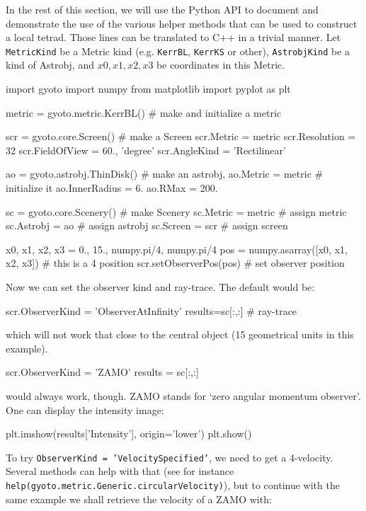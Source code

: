 \documentclass[a4paper,12pt]{article}
\begin{document}
In the rest of this section, we will use the Python API to document
and demonstrate the use of the various helper methods that can be used
to construct a local tetrad. Those lines can be translated to C++ in a
trivial manner. Let \texttt{MetricKind} be a Metric kind
(e.g. \texttt{KerrBL}, \texttt{KerrKS} or other), \texttt{AstrobjKind}
be a kind of Astrobj, and $x0, x1, x2, x3$ be coordinates in this
Metric.
\begin{code}
  import gyoto
  import numpy
  from matplotlib import pyplot as plt

  metric = gyoto.metric.KerrBL()        # make and initialize a metric

  scr = gyoto.core.Screen()             # make a Screen
  scr.Metric       = metric
  scr.Resolution   = 32
  scr.FieldOfView  = 60., 'degree'
  scr.AngleKind    = 'Rectilinear'

  ao = gyoto.astrobj.ThinDisk()         # make an astrobj,
  ao.Metric        = metric             # initialize it
  ao.InnerRadius   = 6.
  ao.RMax          = 200.

  sc = gyoto.core.Scenery()             # make Scenery
  sc.Metric        = metric             # assign metric
  sc.Astrobj       = ao                 # assign astrobj
  sc.Screen        = scr                # assign screen
  
  x0, x1, x2, x3 = 0., 15., numpy.pi/4, numpy.pi/4
  pos = numpy.asarray([x0, x1, x2, x3]) # this is a 4 position
  scr.setObserverPos(pos)               # set observer position
\end{code}

Now we can set the observer kind and ray-trace. The default would be:
\begin{code}
  scr.ObserverKind = 'ObserverAtInfinity'
  results=sc[:,:]                       # ray-trace
\end{code}
which will not work that close to the central object (15 geometrical
units in this example).

\begin{code}
  scr.ObserverKind = 'ZAMO'
  results = sc[:,:]
\end{code}
would always work, though. ZAMO stands for `zero angular momentum
observer'. One can display the intensity image:

\begin{code}
  plt.imshow(results['Intensity'], origin='lower')
  plt.show()
\end{code}

To try \texttt{ObserverKind = 'VelocitySpecified'}, we need to get a
4-velocity. Several methods can help with that (see for instance
\texttt{help(gyoto.metric.Generic.circularVelocity)}), but to continue with the
same example we shall retrieve the velocity of a ZAMO with:
\end{document}

